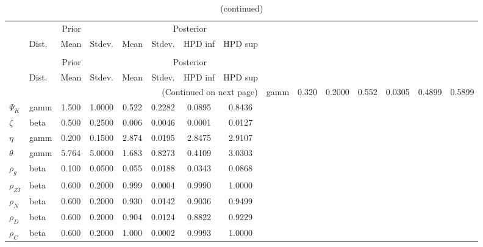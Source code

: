  
\begin{center}
\begin{longtable}{llcccccc} 
\caption{Results from Metropolis-Hastings (parameters)}
 \label{Table:MHPosterior:1}\\
\toprule 
  & \multicolumn{3}{c}{Prior}  &  \multicolumn{4}{c}{Posterior} \\
  \cmidrule(r{.75em}){2-4} \cmidrule(r{.75em}){5-8}
  & Dist. & Mean  & Stdev. & Mean & Stdev. & HPD inf & HPD sup\\
\midrule \endfirsthead 
\caption{(continued)}\\\toprule 
  & \multicolumn{3}{c}{Prior}  &  \multicolumn{4}{c}{Posterior} \\
  \cmidrule(r{.75em}){2-4} \cmidrule(r{.75em}){5-8}
  & Dist. & Mean  & Stdev. & Mean & Stdev. & HPD inf & HPD sup\\
\midrule \endhead 
\bottomrule \multicolumn{8}{r}{(Continued on next page)} \endfoot 
\bottomrule \endlastfoot 
${\sigma_a}$ & gamm &   0.320 & 0.2000 &   0.552& 0.0305 &  0.4899 &  0.5899 \\ 
${\Psi_K}$ & gamm &   1.500 & 1.0000 &   0.522& 0.2282 &  0.0895 &  0.8436 \\ 
${\zeta}$ & beta &   0.500 & 0.2500 &   0.006& 0.0046 &  0.0001 &  0.0127 \\ 
${\eta}$ & gamm &   0.200 & 0.1500 &   2.874& 0.0195 &  2.8475 &  2.9107 \\ 
${\theta}$ & gamm &   5.764 & 5.0000 &   1.683& 0.8273 &  0.4109 &  3.0303 \\ 
${\rho_g}$ & beta &   0.100 & 0.0500 &   0.055& 0.0188 &  0.0343 &  0.0868 \\ 
${\rho_{ZI}}$ & beta &   0.600 & 0.2000 &   0.999& 0.0004 &  0.9990 &  1.0000 \\ 
${\rho_N}$ & beta &   0.600 & 0.2000 &   0.930& 0.0142 &  0.9036 &  0.9499 \\ 
${\rho_D}$ & beta &   0.600 & 0.2000 &   0.904& 0.0124 &  0.8822 &  0.9229 \\ 
${\rho_C}$ & beta &   0.600 & 0.2000 &   1.000& 0.0002 &  0.9993 &  1.0000 \\ 
\end{longtable}
 \end{center}
